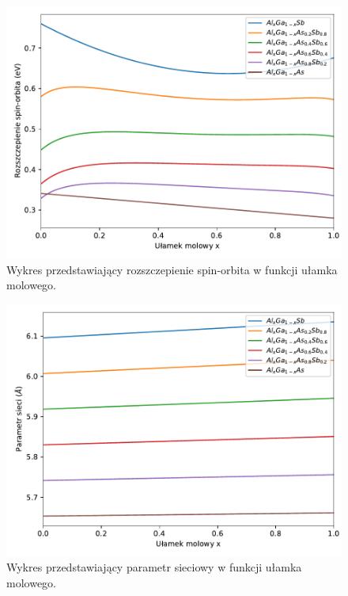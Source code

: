 \documentclass[12pt,openany,a4paper]{book}
\begin{document}
\begin{figure}[H]
	\centering
	\includegraphics[width = 0.9\linewidth]{Figures/quaternary/quat_delta_so_y.pdf}
	\caption{Wykres przedstawiający rozszczepienie spin-orbita w funkcji ułamka 
	molowego.}\label{fig:quat_delta_so_y}
\end{figure}

\begin{figure}[H]
	\centering
	\includegraphics[width = 0.9\linewidth]{Figures/quaternary/quat_alc_y.pdf}
	\caption{Wykres przedstawiający parametr sieciowy w funkcji ułamka 
	molowego.}\label{fig:quat_alc_y}
\end{figure}
\end{document}

